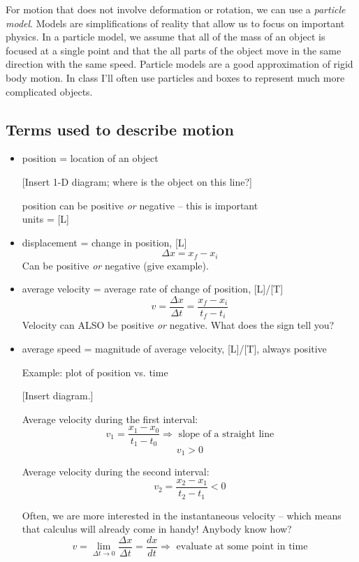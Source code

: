 For motion that does not involve deformation or rotation, we can use a \textit{particle model}. Models are simplifications of reality that allow us to focus on important physics. In a particle model, we assume that all of the mass of an object is focused at a single point and that the all parts of the object move in the same direction with the same speed. Particle models are a good approximation of rigid body motion. In class I'll often use particles and boxes to represent much more complicated objects.

\subsection{Terms used to describe motion}
\begin{itemize}
\item position = location of an object

[Insert 1-D diagram; where is the object on this line?]
\vspace{3cm}


position can be positive \textit{or} negative -- this is important\\
units = [L]

\item displacement = change in position, [L] 
$$\Delta{x}=x_f-x_i$$
Can be positive \textit{or} negative (give example).

\item average velocity = average rate of change of position, [L]/[T]
$$v=\frac{\Delta{x}}{\Delta{t}}=\frac{x_f-x_i}{t_f-t_i}$$
Velocity can ALSO be positive \textit{or} negative. What does the sign tell you?

\item average speed = magnitude of average velocity, [L]/[T], always positive

\clearpage
Example: plot of position vs. time

[Insert diagram.]
\vspace{4cm}

Average velocity during the first interval:
$$v_1=\frac{x_1-x_0}{t_1-t_0}\Rightarrow\mbox{ slope of a straight line}$$
$$v_1>0$$

Average velocity during the second interval:
$$v_2=\frac{x_2-x_1}{t_2-t_1}<0$$

Often, we are more interested in the instantaneous velocity -- which means that calculus will already come in handy! Anybody know how?
$$\boxed{v=\lim_{\Delta{t}\rightarrow{0}}\frac{\Delta{x}}{\Delta{t}}=\frac{dx}{dt}}\Rightarrow\mbox{ evaluate at some point in time}$$


\end{itemize}
